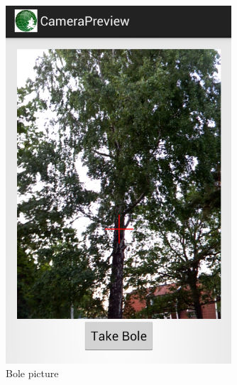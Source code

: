 \begin{figure}[!htb]
	  	\includegraphics[width=0.75\textwidth]{bole.png}
	  	\caption{Bole picture}
	  	\label{bole}
	\endminipage\hfill
\end{figure}

